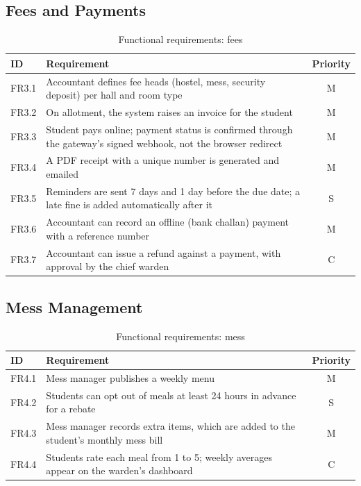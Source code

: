 \documentclass[11pt,a4paper]{report}
\begin{document}
\subsection{Fees and Payments}
\begin{table}[H]
\centering\small
\caption{Functional requirements: fees}\label{tab:fr-fee}
\begin{tabularx}{\textwidth}{lLc}
\toprule
\textbf{ID} & \textbf{Requirement} & \textbf{Priority}\\
\midrule
FR3.1 & Accountant defines fee heads (hostel, mess, security deposit) per hall and room type & M\\
FR3.2 & On allotment, the system raises an invoice for the student & M\\
FR3.3 & Student pays online; payment status is confirmed through the gateway's signed webhook, not the browser redirect & M\\
FR3.4 & A PDF receipt with a unique number is generated and emailed & M\\
FR3.5 & Reminders are sent 7 days and 1 day before the due date; a late fine is added automatically after it & S\\
FR3.6 & Accountant can record an offline (bank challan) payment with a reference number & M\\
FR3.7 & Accountant can issue a refund against a payment, with approval by the chief warden & C\\
\bottomrule
\end{tabularx}
\end{table}

\subsection{Mess Management}
\begin{table}[H]
\centering\small
\caption{Functional requirements: mess}\label{tab:fr-mess}
\begin{tabularx}{\textwidth}{lLc}
\toprule
\textbf{ID} & \textbf{Requirement} & \textbf{Priority}\\
\midrule
FR4.1 & Mess manager publishes a weekly menu & M\\
FR4.2 & Students can opt out of meals at least 24 hours in advance for a rebate & S\\
FR4.3 & Mess manager records extra items, which are added to the student's monthly mess bill & M\\
FR4.4 & Students rate each meal from 1 to 5; weekly averages appear on the warden's dashboard & C\\
\bottomrule
\end{tabularx}
\end{table}
\end{document}
